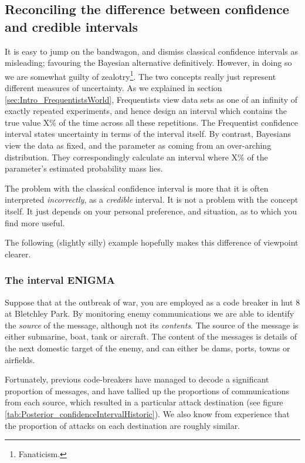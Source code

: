 \documentclass[11pt,fullpage]{book}
\begin{document}
\subsection{Reconciling the difference between confidence and credible intervals}
It is easy to jump on the bandwagon, and dismiss classical confidence intervals as misleading; favouring the Bayesian alternative definitively. However, in doing so we are somewhat guilty of zealotry\footnote{Fanaticism.}. The two concepts really just represent different measures of uncertainty. As we explained in section \ref{sec:Intro_FrequentistsWorld}, Frequentists view data sets as one of an infinity of exactly repeated experiments, and hence design an interval which contains the true value X\% of the time across all these repetitions. The Frequentist confidence interval states uncertainty in terms of the interval itself. By contrast, Bayesians view the data as fixed, and the parameter as coming from an over-arching distribution. They correspondingly calculate an interval where X\% of the parameter's estimated probability mass lies.

The problem with the classical confidence interval is more that it is often interpreted \textit{incorrectly}, as a \textit{credible} interval. It is not a problem with the concept itself. It just depends on your personal preference, and situation, as to which you find more useful.

The following (slightly silly) example hopefully makes this difference of viewpoint clearer. 

\subsubsection{The interval ENIGMA}
Suppose that at the outbreak of war, you are employed as a code breaker in hut 8 at Bletchley Park. By monitoring enemy communications we are able to identify the \textit{source} of the message, although not its \textit{contents}. The source of the message is either submarine, boat, tank or aircraft. The content of the messages is details of the next domestic target of the enemy, and can either be dams, ports, towns or airfields.

Fortunately, previous code-breakers have managed to decode a significant proportion of messages, and have tallied up the proportions of communications from each source, which resulted in a particular attack destination (see figure \ref{tab:Posterior_confidenceIntervalHistoric}). We also know from experience that the proportion of attacks on each destination are roughly similar.
\end{document}
